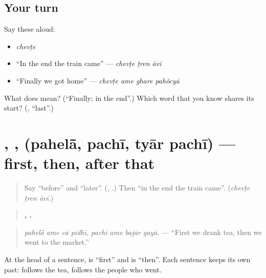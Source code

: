 \subsection*{Your turn}
Say these aloud:

\begin{itemize}
\raggedright
  \item \emph{chevṭe}
  \item \textquotedblleft{}In the end the train came\textquotedblright{} — \emph{chevṭe ṭren āvī}
  \item \textquotedblleft{}Finally we got home\textquotedblright{} — \emph{chevṭe ame ghare pahõcyā}
\end{itemize}

\begin{tcolorbox}[breakable,colback=teal!4,colframe=teal!35!black,title={Before you move on}]
What does \textbf{} mean? (\textquotedblleft{}Finally; in the end\textquotedblright{}.) Which word that you know shares its start? (\textbf{}, \textquotedblleft{}last\textquotedblright{}.)
\end{tcolorbox}
\section[\texorpdfstring{\gu{પહેલાં} · \gu{પછી} … (pahelā̃ · pachī …)}{પહેલાં · પછી … (pahelā̃ · pachī …)}]{, ,   (pahelā̃, pachī, tyār pachī) — first, then, after that}

\label{lesson:GU-C276-pahela-pachi}



\begin{quote}
Say \textquotedblleft{}before\textquotedblright{} and \textquotedblleft{}later\textquotedblright{}. (\textbf{}, \textbf{}.) Then \textquotedblleft{}in the end the train came\textquotedblright{}. (\emph{chevṭe ṭren āvī}.)
\end{quote}

\begin{grammarlens}[title={Grammar Lens: first, then}]
\begin{quote}
\textbf{   ,    .}
\end{quote}

\begin{quote}
\emph{pahelā̃ ame cā pīdhī, pachī ame bajār gayā.} — \textquotedblleft{}First we drank tea, then we went to the market.\textquotedblright{}
\end{quote}

At the head of a sentence, \textbf{} is \textquotedblleft{}first\textquotedblright{} and \textbf{} is \textquotedblleft{}then\textquotedblright{}. Each sentence keeps its own past: \textbf{  } follows the tea, \textbf{  } follows the people who went.
\end{grammarlens}

